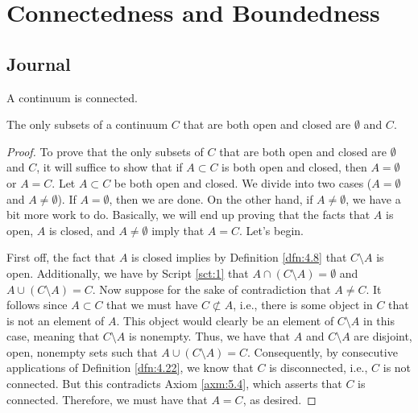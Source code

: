 \documentclass[../main.tex]{subfiles}
\begin{document}
\chapter{Connectedness and Boundedness}\label{sct:5}
\section{Journal}
\begin{axiom}\label{axm:5.4}
    A continuum is connected.
\end{axiom}

\begin{theorem}\label{trm:5.1}
    The only subsets of a continuum $C$ that are both open and closed are $\emptyset$ and $C$.
    \begin{proof}
        To prove that the only subsets of $C$ that are both open and closed are $\emptyset$ and $C$, it will suffice to show that if $A\subset C$ is both open and closed, then $A=\emptyset$ or $A=C$. Let $A\subset C$ be both open and closed. We divide into two cases ($A=\emptyset$ and $A\neq\emptyset$). If $A=\emptyset$, then we are done. On the other hand, if $A\neq\emptyset$, we have a bit more work to do. Basically, we will end up proving that the facts that $A$ is open, $A$ is closed, and $A\neq\emptyset$ imply that $A=C$. Let's begin.\par
        First off, the fact that $A$ is closed implies by Definition \ref{dfn:4.8} that $C\setminus A$ is open. Additionally, we have by Script \ref{sct:1} that $A\cap(C\setminus A)=\emptyset$ and $A\cup(C\setminus A)=C$. Now suppose for the sake of contradiction that $A\neq C$. It follows since $A\subset C$ that we must have $C\not\subset A$, i.e., there is some object in $C$ that is not an element of $A$. This object would clearly be an element of $C\setminus A$ in this case, meaning that $C\setminus A$ is nonempty. Thus, we have that $A$ and $C\setminus A$ are disjoint, open, nonempty sets such that $A\cup(C\setminus A)=C$. Consequently, by consecutive applications of Definition \ref{dfn:4.22}, we know that $C$ is disconnected, i.e., $C$ is not connected. But this contradicts Axiom \ref{axm:5.4}, which asserts that $C$ is connected. Therefore, we must have that $A=C$, as desired.
    \end{proof}
\end{theorem}
\end{document}

